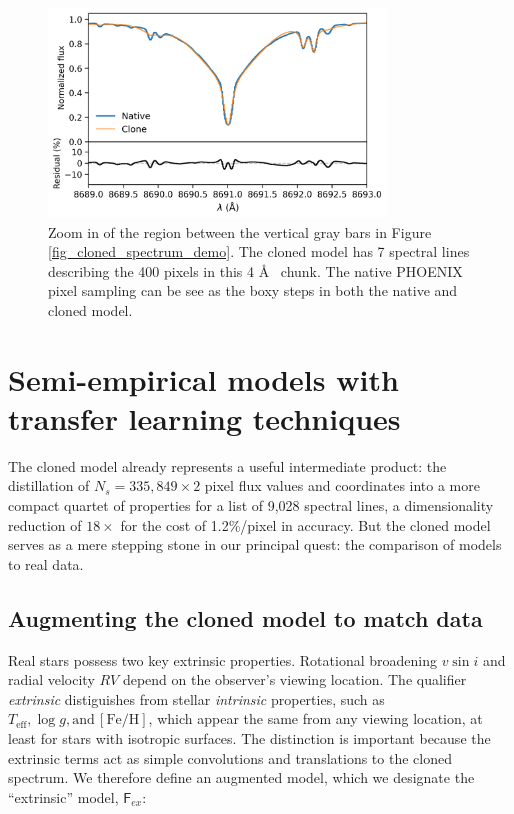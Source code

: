 \documentclass[modern]{aastex631}
\begin{document}
\begin{figure}[hbt!]
    \centering
    \includegraphics[width=0.8\textwidth]{figures/blase_clone_demo_zoom.png}
    \caption{Zoom in of the region between the vertical gray bars in Figure \ref{fig_cloned_spectrum_demo}. The cloned model has 7 spectral lines describing the 400 pixels in this 4 \AA~ chunk.  The native PHOENIX pixel sampling can be see as the boxy steps in both the native and cloned model.  }
    \label{fig_zoom_cloning_performance}
\end{figure}


\section{Semi-empirical models with transfer learning techniques}\label{transferLearn}


The cloned model already represents a useful intermediate product: the distillation of $N_s=335,849\times2$ pixel flux values and coordinates into a more compact quartet of properties for a list of 9,028 spectral lines, a dimensionality reduction of $18\times$ for the cost of 1.2\%/pixel in accuracy.  But the cloned model serves as a mere stepping stone in our principal quest: the comparison of models to real data.

\subsection{Augmenting the cloned model to match data}
Real stars possess two key extrinsic properties.  Rotational broadening $v\sin{i}$ and radial velocity $RV$ depend on the observer's viewing location. The qualifier \emph{extrinsic} distiguishes from stellar \emph{intrinsic} properties, such as $T_{\mathrm{eff}}, \log{g},\mathrm{and\,} [\mathrm{Fe}/\mathrm{H}]$, which appear the same from any viewing location, at least for stars with isotropic surfaces.  The distinction is important because the extrinsic terms act as simple convolutions and translations to the cloned spectrum.  We therefore define an augmented model, which we designate the ``extrinsic'' model, $\mathsf{F}_{ex}$:
\end{document}
